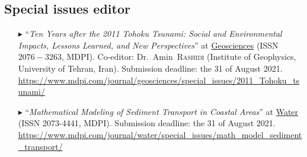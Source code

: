 \separator
\subsection{Special issues editor}

\begin{itemize}

  \item[$\blacktriangleright$] ``\textit{Ten Years after the 2011 Tohoku Tsunami: Social and Environmental Impacts, Lessons Learned, and New Perspectives}'' at \href{https://www.mdpi.com/journal/geosciences}{Geosciences} (ISSN $2076-3263$, MDPI). Co-editor: Dr.~Amin~\textsc{Rashidi} (Institute of Geophysics, University of Tehran, Iran). Submission deadline: the 31 of August 2021. \\
  {\small\url{https://www.mdpi.com/journal/geosciences/special_issues/2011_Tohoku_tsunami/}}
  
  \item[$\blacktriangleright$] ``\textit{Mathematical Modeling of Sediment Transport in Coastal Areas}'' at \href{https://www.mdpi.com/journal/water}{Water} (ISSN 2073-4441, MDPI). Submission deadline: the 31 of August 2021. \\
  {\small\url{https://www.mdpi.com/journal/water/special_issues/math_model_sediment_transport/}}

\end{itemize}